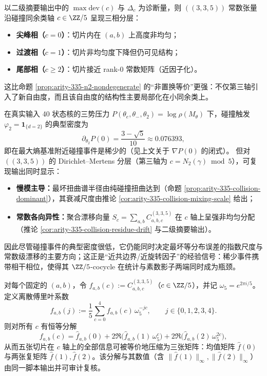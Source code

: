 \begin{corollary}[三相分层：$c=0$ 的结构尖峰、$c=1$ 的过渡与 $c\ge 2$ 的近因子化尾部]\label{cor:arity-335-phase-stratification}
以二级摘要输出中的 $\max\mathrm{dev}(c)$ 与 $\Delta_c$ 为诊断量，则 \(((3,3,5))\) 常数张量沿碰撞同余类轴 $c\in\ZZ/5$ 呈现三相分层：
\begin{itemize}
  \item \textbf{尖峰相（$c=0$）}：切片内在 $(a,b)$ 上高度非均匀；
  \item \textbf{过渡相（$c=1$）}：切片非均匀度下降但仍可见结构；
  \item \textbf{尾部相（$c\ge 2$）}：切片接近 rank-$0$ 常数矩阵（近因子化）。
\end{itemize}
这比命题 \ref{prop:arity-335-n2-nondegenerate} 的“非置换等价”更强：不仅第三轴引入了新自由度，而且该自由度的结构性主要局部化在小同余类上。
\end{corollary}

\begin{corollary}\label{cor:arity-335-rare-collision-dominant}
在真实输入 40 状态核的三势压力 $P(\theta_e,\theta_-,\theta_2)=\log\rho(M_\theta)$ 下，碰撞触发 $\varphi_2=\mathbf{1}_{\{d=2\}}$ 的典型密度为
\[
\partial_{\theta_2}P(0)=\frac{3-\sqrt5}{10}\approx 0.076393,
\]
即在最大熵基准附近碰撞事件是稀少的（见上文关于 $\nabla P(0)$ 的闭式）。
但对 \(((3,3,5))\) 的 Dirichlet--Mertens 分层（第三轴为 $c=N_2(\gamma)\bmod 5$），可复现输出同时显示：
\begin{itemize}
  \item \textbf{慢模主导：}最坏扭曲谱半径由纯碰撞扭曲达到（命题 \ref{prop:arity-335-collision-dominant}），其衰减尺度由推论 \ref{cor:arity-335-collision-mixing-scale} 给出；
  \item \textbf{常数各向异性：}聚合漂移向量 $S_c=\sum_{a,b}C^{(3,3,5)}_{a,b,c}$ 在 $c$ 轴上呈强非均匀分配（推论 \ref{cor:arity-335-collision-residue-drift} 与二级摘要输出）。
\end{itemize}
因此尽管碰撞事件的典型密度很低，它仍能同时决定最坏等分布误差的指数尺度与常数级漂移的主要方向；这正是“近共边界/近旋转因子”的经验信号：稀少事件携带相干相位，使得其 \(\ZZ/5\)-cocycle 在统计与素数影子两端同时成为瓶颈。
\end{corollary}

\begin{proposition}\label{prop:arity-335-fourier-fingerprint}
对每个固定的 $(a,b)$，令 $f_{a,b}(c):=C^{(3,3,5)}_{a,b,c}$（$c\in\ZZ/5$），并记 $\omega_5=e^{2\pi i/5}$。定义离散傅里叶系数
\[
\widehat f_{a,b}(j):=\frac15\sum_{c=0}^{4} f_{a,b}(c)\,\omega_5^{-jc},
\qquad j\in\{0,1,2,3,4\}.
\]
则对所有 $c$ 有恒等分解
\[
f_{a,b}(c)
=\widehat f_{a,b}(0)
+2\Re\bigl(\widehat f_{a,b}(1)\,\omega_5^{c}\bigr)
+2\Re\bigl(\widehat f_{a,b}(2)\,\omega_5^{2c}\bigr),
\]
从而五张切片在 $c$ 轴上的全部信息可被等价地压缩为三张矩阵：均值矩阵 $\widehat f(0)$ 与两张复矩阵 $\widehat f(1),\widehat f(2)$。该分解与其数值（含 $\|\widehat f(1)\|_\infty,\|\widehat f(2)\|_\infty$）由同一脚本输出并可审计复核。
\end{proposition}

